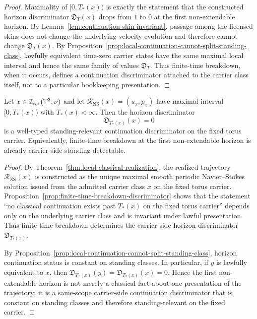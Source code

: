 \begin{proof}
Maximality of $[0,T_*(x))$ is exactly the statement that the constructed horizon discriminator
$\mathfrak D_T(x)$ drops from $1$ to $0$ at the first non-extendable horizon. By
Lemma~\ref{lem:continuation-skin-invariant}, passage among the licensed skins does not change the
underlying velocity evolution and therefore cannot change $\mathfrak D_T(x)$. By
Proposition~\ref{prop:local-continuation-cannot-split-standing-class}, lawfully equivalent time-zero
carrier states have the same maximal local interval and hence the same family of values
$\mathfrak D_T$. Thus finite-time breakdown, when it occurs, defines a continuation discriminator
attached to the carrier class itself, not to a particular bookkeeping presentation.
\end{proof}

\begin{manualtheorem}
\label{thm:horizon-detectability}
Let $x\in\mathcal I_{\mathrm{car}}(\mathbb{T}^3,\nu)$ and let
$\mathcal R_{\mathrm{NS}}(x)=(u_x,p_x)$ have maximal interval $[0,T_*(x))$ with $T_*(x)<\infty$.
Then the horizon discriminator
\[
\mathfrak D_{T_*(x)}(x)
=
0
\]
is a well-typed standing-relevant continuation discriminator on the fixed torus carrier. Equivalently,
finite-time breakdown at the first non-extendable horizon is already carrier-side standing-detectable.
\end{manualtheorem}

\begin{proof}
By Theorem~\ref{thm:local-classical-realization}, the realized trajectory $\mathcal R_{\mathrm{NS}}(x)$ is
constructed as the unique maximal smooth periodic Navier--Stokes solution issued from the admitted
carrier class $x$ on the fixed torus carrier. Proposition~\ref{prop:finite-time-breakdown-discriminator}
shows that the statement ``no classical continuation exists past $T_*(x)$ on the fixed torus carrier''
depends only on the underlying carrier class and is invariant under lawful presentation. Thus finite-time
breakdown determines the carrier-side horizon discriminator $\mathfrak D_{T_*(x)}$.

By Proposition~\ref{prop:local-continuation-cannot-split-standing-class}, horizon continuation status is
constant on standing classes. In particular, if $y$ is lawfully equivalent to $x$, then
$\mathfrak D_{T_*(x)}(y)=\mathfrak D_{T_*(x)}(x)=0$. Hence the first non-extendable horizon is not merely a
classical fact about one presentation of the trajectory; it is a same-scope carrier-side continuation
discriminator that is constant on standing classes and therefore standing-relevant on the fixed carrier.
\end{proof}


